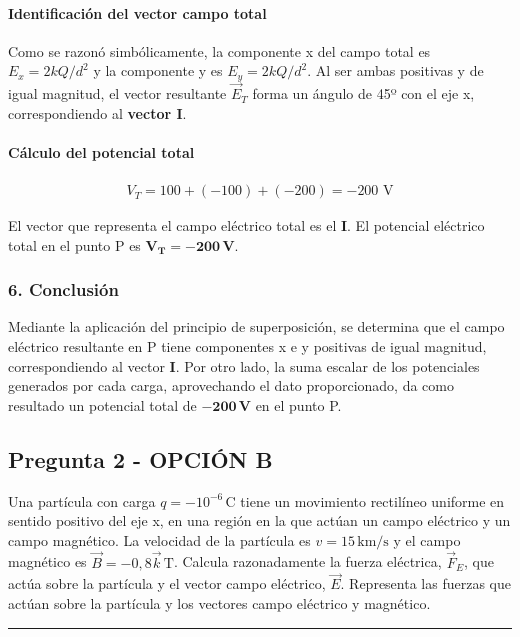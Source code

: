\paragraph*{Identificación del vector campo total}
Como se razonó simbólicamente, la componente x del campo total es $E_x = 2kQ/d^2$ y la componente y es $E_y = 2kQ/d^2$. Al ser ambas positivas y de igual magnitud, el vector resultante $\vec{E}_T$ forma un ángulo de 45º con el eje x, correspondiendo al \textbf{vector I}.

\paragraph*{Cálculo del potencial total}
\begin{gather}
    V_T = 100 + (-100) + (-200) = -200 \text{ V}
\end{gather}
\begin{cajaresultado}
    El vector que representa el campo eléctrico total es el \textbf{I}. El potencial eléctrico total en el punto P es $\boldsymbol{V_T = -200 \, V}$.
\end{cajaresultado}

\subsubsection*{6. Conclusión}
\begin{cajaconclusion}
    Mediante la aplicación del principio de superposición, se determina que el campo eléctrico resultante en P tiene componentes x e y positivas de igual magnitud, correspondiendo al vector \textbf{I}. Por otro lado, la suma escalar de los potenciales generados por cada carga, aprovechando el dato proporcionado, da como resultado un potencial total de $\mathbf{-200 \, V}$ en el punto P.
\end{cajaconclusion}

\newpage

\subsection{Pregunta 2 - OPCIÓN B}
\label{subsec:2B_2025_jul_ord}

\begin{cajaenunciado}
Una partícula con carga $q=-10^{-6}\,\text{C}$ tiene un movimiento rectilíneo uniforme en sentido positivo del eje x, en una región en la que actúan un campo eléctrico y un campo magnético. La velocidad de la partícula es $v=15\,\text{km/s}$ y el campo magnético es $\vec{B}=-0,8\vec{k}\,\text{T}$. Calcula razonadamente la fuerza eléctrica, $\vec{F}_{E}$, que actúa sobre la partícula y el vector campo eléctrico, $\vec{E}$. Representa las fuerzas que actúan sobre la partícula y los vectores campo eléctrico y magnético.
\end{cajaenunciado}
\hrule

